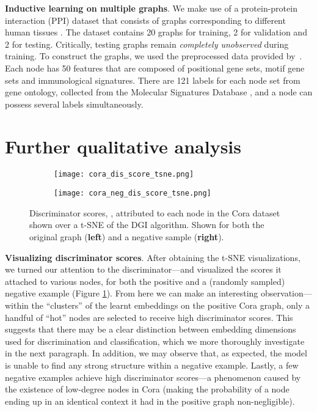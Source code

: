 \documentclass{article} \usepackage{iclr2019_conference,times}
\newcommand{\xhdr}[1]{{\noindent\bfseries #1}.}
\begin{document}
\xhdr{Inductive learning on multiple graphs}
We make use of a protein-protein interaction (PPI) dataset that consists of graphs corresponding to different human tissues \citep{zitnik2017predicting}. The dataset contains 20 graphs for training, 2 for validation and 2 for testing. Critically, testing graphs remain \emph{completely unobserved} during training. To construct the graphs, we used the preprocessed data provided by~\cite{hamilton2017inductive}. Each node has 50 features that are composed of positional gene sets, motif gene sets and immunological signatures. There are 121 labels for each node set from gene ontology, collected from the Molecular Signatures Database \citep{subramanian2005gene}, and a node can possess several labels simultaneously.

\section{Further qualitative analysis}\label{app:quali}

\begin{figure}
\centering
\begin{subfigure}{0.5\textwidth}
  \centering
  \texttt{[image: cora\_dis\_score\_tsne.png]}
\end{subfigure}\begin{subfigure}{0.5\textwidth}
  \centering
  \texttt{[image: cora\_neg\_dis\_score\_tsne.png]}
\end{subfigure}
\caption{Discriminator scores, , attributed to each node in the Cora dataset shown over a t-SNE of the DGI algorithm. Shown for both the original graph ({\bf left}) and a negative sample ({\bf right}).}
\label{fig:cora_dis_score_tsne}
\end{figure}

\xhdr{Visualizing discriminator scores} 
After obtaining the t-SNE visualizations, we turned our attention to the discriminator---and visualized the scores it attached to various nodes, for both the positive and a (randomly sampled) negative example (Figure \ref{fig:cora_dis_score_tsne}). From here we can make an interesting observation---within the ``clusters'' of the learnt embeddings on the positive Cora graph, only a handful of ``hot'' nodes are selected to receive high discriminator scores. This suggests that there may be a clear distinction between embedding dimensions used for discrimination and classification, which we more thoroughly investigate in the next paragraph. In addition, we may observe that, as expected, the model is unable to find any strong structure within a negative example. Lastly, a few negative examples achieve high discriminator scores---a phenomenon caused by the existence of low-degree nodes in Cora (making the probability of a node ending up in an identical context it had in the positive graph non-negligible).
\end{document}
